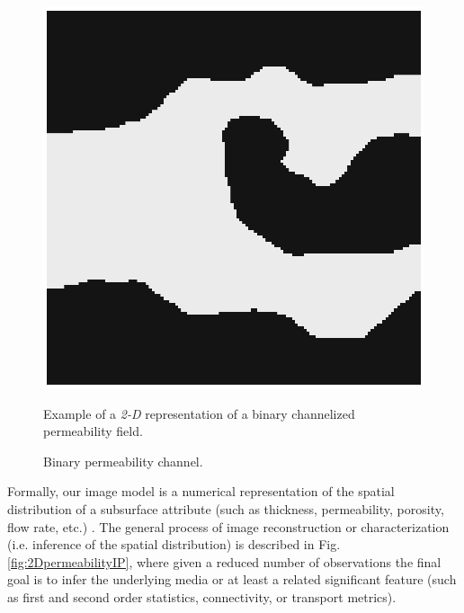 		\begin{figure}[H]
		\centering
		\includegraphics[width=0.2	\textwidth]{Figs_QE/ImagenOriginal}

		\caption{Binary permeability channel.}
		\scriptsize{Example of a \emph{2-D} representation of a binary channelized permeability field.}
		\label{fig:2Dpermeabilityfield}
		\end{figure}



 Formally, our image model is a numerical representation of the spatial distribution of a subsurface  attribute (such as thickness, permeability, porosity, flow rate, etc.) \cite{katanidis_1997_a, Lam_1983_a, Matheron_1971_a}. The general process of image reconstruction or characterization (i.e. inference of the spatial distribution) is described in Fig. \ref{fig:2DpermeabilityIP}, where given a reduced number of observations the final goal is to infer the underlying media or at least a related significant feature (such as first and second order statistics, connectivity, or transport metrics).


